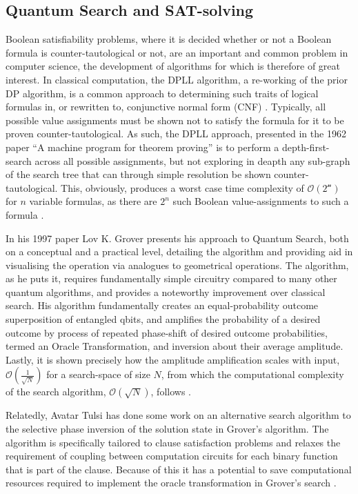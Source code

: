 \documentclass[msc,lith,english]{liuthesis}
\begin{document}
\subsection{Quantum Search and SAT-solving}
Boolean satisfiability problems, where it is decided whether or not a Boolean formula is counter-tautological or not, are an important and common problem in computer science, the development of algorithms for which is therefore of great interest. In classical computation, the DPLL algorithm, a re-working of the prior DP algorithm, is a common approach to determining such traits of logical formulas in, or rewritten to, conjunctive normal form (CNF) \cite{QWSBA}. Typically, all possible value assignments must be shown not to satisfy the formula for it to be proven counter-tautological. As such, the DPLL approach, presented in the 1962 paper ``A machine program for theorem proving'' is to perform a depth-first-search across all possible assignments, but not exploring in deapth any sub-graph of the search tree that can through simple resolution be shown counter-tautological. This, obviously, produces a worst case time complexity of $\mathcal{O(2^n)}$ for $n$ variable formulas, as there are $2^n$ such Boolean value-assignments to such a formula \cite{DPLL}.  

In his 1997 paper Lov K. Grover presents his approach to Quantum Search, both on a conceptual and a practical level, detailing the algorithm and providing aid in visualising the operation via analogues to geometrical operations. The algorithm, as he puts it, requires fundamentally simple circuitry compared to many other quantum algorithms, and provides a noteworthy improvement over classical search. His algorithm fundamentally creates an equal-probability outcome superposition of entangled qbits, and amplifies the probability of a desired outcome by process of repeated phase-shift of desired outcome probabilities, termed an Oracle Transformation, and inversion about their average amplitude. Lastly, it is shown precisely how the amplitude amplification scales with input, $\mathcal{O}(\frac{1}{\sqrt{N}})$ for a search-space of size $N$, from which the computational complexity of the search algorithm, $\mathcal{O}(\sqrt{N})$, follows \cite{QMHSNH}.

Relatedly, Avatar Tulsi has done some work on an alternative search algorithm to the selective phase inversion of the solution state in Grover's algorithm. The algorithm is specifically tailored to clause satisfaction problems and relaxes the requirement of coupling between computation circuits for each binary function that is part of the clause. Because of this it has a potential to save computational resources required to implement the oracle transformation in Grover's search \cite{QuantumCSPSearch}.
\end{document}
